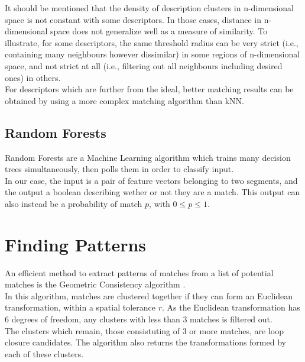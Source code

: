 It should be mentioned that the density of description clusters in n-dimensional space is not constant with some descriptors. In those cases, distance in n-dimensional space does not generalize well as a measure of similarity. To illustrate, for some descriptors, the same threshold radius can be very strict (i.e., containing many neighbours however dissimilar) in some regions of n-dimensional space, and not strict at all (i.e., filtering out all neighbours including desired ones) in others.\\

For descriptors which are further from the ideal, better matching results can be obtained by using a more complex matching algorithm than kNN.

\subsection{Random Forests}
\label{subsec:RF}

Random Forests are a Machine Learning algorithm which trains many decision trees simultaneously, then polls them in order to classify input.\\

In our case, the input is a pair of feature vectors belonging to two segments, and the output a boolean describing wether or not they are a match. This output can also instead be a probability of match $p$, with $0 \leq p \leq 1$.


\section{Finding Patterns}
\label{sec:filtering}

An efficient method to extract patterns of matches from a list of potential matches is the Geometric Consistency algorithm \cite{geometric-consistency}.\\

In this algorithm, matches are clustered together if they can form an Euclidean transformation, within a spatial tolerance $r$. As the Euclidean transformation has 6 degrees of freedom, any clusters with less than 3 matches is filtered out.\\

The clusters which remain, those consistuting of 3 or more matches, are loop closure candidates. The algorithm also returns the transformations formed by each of these clusters.\\

